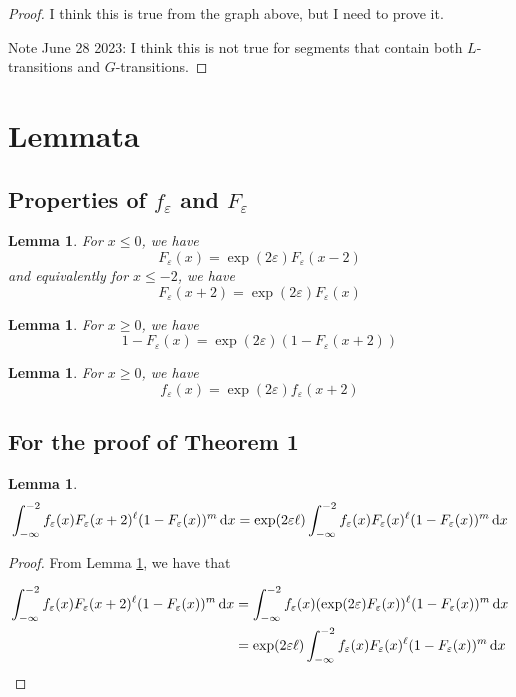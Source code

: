 \documentclass{article}
\newtheorem{lemma}[theorem]{Lemma}
\renewcommand{\epsilon}{\varepsilon}
\newcommand{\1}{\langle 1 \rangle}
\newcommand{\2}{\langle 2 \rangle}
\begin{document}
\begin{proof}
    I think this is true from the graph above, but I need to prove it.

    Note June 28 2023: I think this is not true for segments that contain both $L$-transitions and $G$-transitions.
\end{proof}

\appendix

\section{Lemmata}

\subsection{Properties of $f_\epsilon$ and $F_\epsilon$}

\begin{lemma} 
    \label{lemma:F_equality_neg}
    For $x \leq 0$, we have 
    \[F_\epsilon(x) = \exp(2\epsilon)F_\epsilon(x - 2)\]
    and equivalently for $x \leq -2$, we have 
    \[F_\epsilon(x + 2) = \exp(2\epsilon)F_\epsilon(x)\]
\end{lemma}

\begin{lemma}
    \label{lemma:F_equality_pos}
    For $x \geq 0$, we have \[1 - F_{\epsilon}(x) = \exp(2\epsilon) (1 - F_\epsilon(x + 2))\]
\end{lemma}

\begin{lemma}
    \label{lemma:f_equality}
    For $x \geq 0$, we have
    \[f_\epsilon(x) = \exp(2\epsilon) f_\epsilon(x + 2) \]
\end{lemma}

\subsection{For the proof of Theorem 1}
\begin{lemma} 
    \label{lemma:sl_tight_minus_infty} 
    \[\int_{-\infty}^{-2} f_{\epsilon}(x) F_{\epsilon}(x + 2)^\ell (1 - F_{\epsilon}(x))^m \dif x = \exp(2 \epsilon \ell) \int_{-\infty}^{-2} f_{\epsilon}(x) F_{\epsilon}(x)^\ell (1 - F_{\epsilon}(x))^m \dif x\]
\end{lemma}

\begin{proof}
    From Lemma \ref{lemma:F_equality_neg}, we have that 

    \begin{align*}
        \int_{-\infty}^{-2} f_{\epsilon}(x) F_{\epsilon}(x + 2)^\ell (1 - F_{\epsilon}(x))^m \dif x &= \int_{-\infty}^{-2} f_{\epsilon}(x) (\exp(2\epsilon) F_{\epsilon}(x))^\ell (1 - F_{\epsilon}(x))^m \dif x \\
        &= \exp(2\epsilon \ell) \int_{-\infty}^{-2} f_{\epsilon}(x) F_{\epsilon}(x)^\ell (1 - F_{\epsilon}(x))^m \dif x
    \end{align*}
\end{proof}
\end{document}
